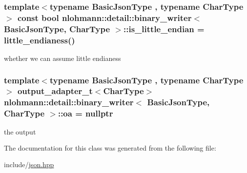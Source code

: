 \subsubsection[{\texorpdfstring{is\+\_\+little\+\_\+endian}{is_little_endian}}]{\setlength{\rightskip}{0pt plus 5cm}template$<$typename Basic\+Json\+Type , typename Char\+Type $>$ const bool {\bf nlohmann\+::detail\+::binary\+\_\+writer}$<$ Basic\+Json\+Type, Char\+Type $>$\+::is\+\_\+little\+\_\+endian = {\bf little\+\_\+endianess}()\hspace{0.3cm}{\ttfamily [private]}}\hypertarget{classnlohmann_1_1detail_1_1binary__writer_a048887c907afe39759b777e8c888414c}{}\label{classnlohmann_1_1detail_1_1binary__writer_a048887c907afe39759b777e8c888414c}


whether we can assume little endianess 

\subsubsection[{\texorpdfstring{oa}{oa}}]{\setlength{\rightskip}{0pt plus 5cm}template$<$typename Basic\+Json\+Type , typename Char\+Type $>$ {\bf output\+\_\+adapter\+\_\+t}$<$Char\+Type$>$ {\bf nlohmann\+::detail\+::binary\+\_\+writer}$<$ Basic\+Json\+Type, Char\+Type $>$\+::oa = nullptr\hspace{0.3cm}{\ttfamily [private]}}\hypertarget{classnlohmann_1_1detail_1_1binary__writer_a6f15b782a7900f50ef37d123008e601b}{}\label{classnlohmann_1_1detail_1_1binary__writer_a6f15b782a7900f50ef37d123008e601b}


the output 



The documentation for this class was generated from the following file\+:\begin{DoxyCompactItemize}
\item 
include/\hyperlink{json_8hpp}{json.\+hpp}\end{DoxyCompactItemize}

